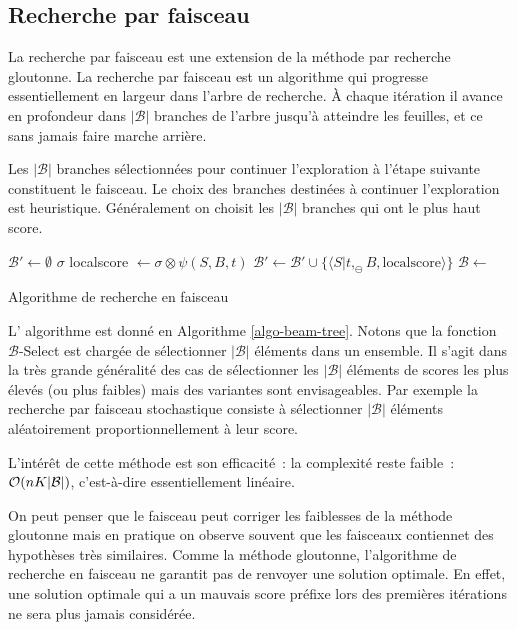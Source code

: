 \documentclass[11pt,openany]{book}
\newcommand{\ac}[1]{{\sc #1}} %
\begin{document}
\subsection{Recherche par faisceau}

La recherche par faisceau est une extension de la méthode par recherche gloutonne.
La recherche par faisceau est un algorithme qui progresse
essentiellement en largeur dans l'arbre de recherche. \`A chaque itération il avance en
profondeur dans $|\mathcal{B}|$ branches de l'arbre jusqu'à atteindre les
feuilles, et ce sans jamais faire marche arrière.

Les $|\mathcal{B}|$ branches sélectionnées pour continuer l'exploration à l'étape
suivante constituent le faisceau. 
Le choix des branches destinées à continuer l'exploration 
est heuristique. Généralement on choisit les $|\mathcal{B}|$ branches qui ont le
plus haut score. 

\begin{algorithm}[htbp]
\begin{algorithmic}[1]
\State $\mathcal{B}' \gets \emptyset$
\State \Return $\sigma$
\EndIf
{}
	\State localscore $\gets \sigma \otimes \psi(S,B,t)$
        \State $\mathcal{B'} \gets \mathcal{B}' \cup \{\langle
        S|t,_\ominus B,\text{localscore}\rangle\}$
\EndFor
\EndFor
\State $\mathcal{B} \gets$ 
\State \Return {}
\EndFunction
\end{algorithmic}
\caption{\label{algo-beam-tree}Algorithme de recherche en faisceau}
\end{algorithm}
L' algorithme est donné en Algorithme \ref{algo-beam-tree}.
Notons que la fonction \ac{$\mathcal{B}$-Select} est chargée de sélectionner $|\mathcal{B}|$ éléments dans un
ensemble. Il s'agit dans la très grande généralité des cas
 de sélectionner les $|\mathcal{B}|$ éléments de scores les plus élevés (ou plus faibles)
 mais des variantes sont envisageables. Par exemple la recherche par faisceau
 stochastique consiste à sélectionner $|\mathcal{B}|$ éléments aléatoirement
 proportionnellement à leur score. 

L'intérêt de cette méthode est son efficacité~: la complexité reste faible~:
${\cal O}(n K |\mathcal{B}|)$, c'est-à-dire essentiellement linéaire.

On peut penser que le faisceau peut corriger les faiblesses de la méthode
gloutonne mais en pratique on observe souvent que les faisceaux
contiennet des hypothèses très similaires.
Comme la méthode gloutonne, l'algorithme de recherche en faisceau ne
garantit pas de renvoyer une solution optimale. 
En effet, une solution optimale qui a un mauvais score préfixe lors
des premières itérations ne sera plus jamais considérée. 
\end{document}
